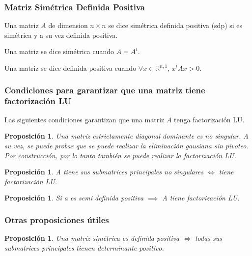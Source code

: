 \documentclass[10pt,a4paper]{article}
\newtheorem{proposition}[theorem]{Proposición}
\newenvironment{definition}[1][Definición]{\begin{trivlist}
\item[\hskip \labelsep {\bfseries #1}]}{\end{trivlist}}
\begin{document}
\subsubsection{Matriz Simétrica Definida Positiva}

\begin{definition}
Una matriz $A$ de dimension $n \times n$ se dice simétrica definida positiva (sdp) si es simétrica y a su vez definida positiva.
\end{definition}

\begin{definition}
Una matriz se dice simétrica cuando $A = A^t$.
\end{definition}

\begin{definition}
Una matriz se dice definida positiva cuando $\forall x \in \mathbb{R}^{n,1}$, $x^t A x > 0$.
\end{definition}

\subsubsection{Condiciones para garantizar que una matriz tiene factorización LU}

Las siguientes condiciones garantizan que una matriz $A$ tenga factorización LU.

\begin{proposition}
Una matriz estrictamente diagonal dominante es no singular. A su vez, se puede probar que se puede realizar la eliminación gausiana sin pivoteo. Por construcción, por lo tanto también se puede realizar la factorización LU.
\end{proposition}

\begin{proposition}
A tiene sus submatrices principales no singulares $\iff$ tiene factorización LU.
\end{proposition}

\begin{proposition}
Si a es semi definida positiva $\implies$ A tiene factorización LU.
\end{proposition}

\subsubsection{Otras proposiciones útiles}

\begin{proposition}
Una matriz simétrica es definida positiva $\iff$ todas sus submatrices principales tienen determinante positivo.
\end{proposition}
\end{document}
